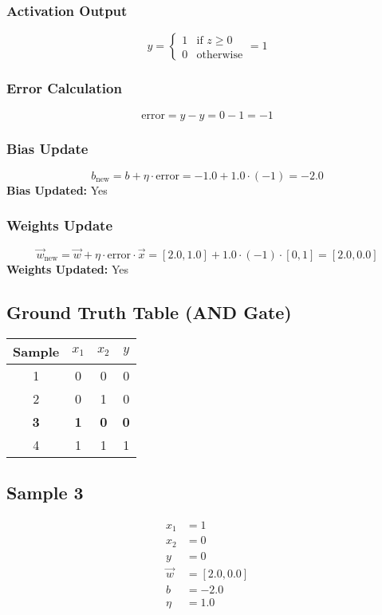 \documentclass{article}
\begin{document}
\subsubsection*{Activation Output}
\[
\hat{y} =
\begin{cases}
1 & \text{if } z \geq 0 \\
0 & \text{otherwise}
\end{cases}
= 1
\]

\subsubsection*{Error Calculation}
\[
\text{error} = y - \hat{y} = 0 - 1 = -1
\]

\subsubsection*{Bias Update}
\[
b_{\text{new}} = b + \eta \cdot \text{error} = -1.0 + 1.0 \cdot (-1) = -2.0
\]
\textbf{Bias Updated:} Yes

\subsubsection*{Weights Update}
\[
\vec{w}_{\text{new}} = \vec{w} + \eta \cdot \text{error} \cdot \vec{x} = 
[2.0, 1.0] + 1.0 \cdot (-1) \cdot [0, 1] = 
[2.0, 0.0]
\]
\textbf{Weights Updated:} Yes

\subsection*{Ground Truth Table (AND Gate)}
\begin{center}
\begin{tabular}{|c|c|c|c|}
\hline
\textbf{Sample} & $x_1$ & $x_2$ & $y$ \\
\hline
1 & 0 & 0 & 0 \\
\hline
2 & 0 & 1 & 0 \\
\hline
\rowcolor{yellow} \textbf{3} & \textbf{1} & \textbf{0} & \textbf{0} \\
\hline
4 & 1 & 1 & 1 \\
\hline
\end{tabular}
\end{center}

\subsection*{Sample 3}
\begin{align*}
x_1 &= 1 \\
x_2 &= 0 \\
y &= 0 \\
\vec{w} &= [2.0, 0.0] \\
b &= -2.0 \\
\eta &= 1.0
\end{align*}
\end{document}

